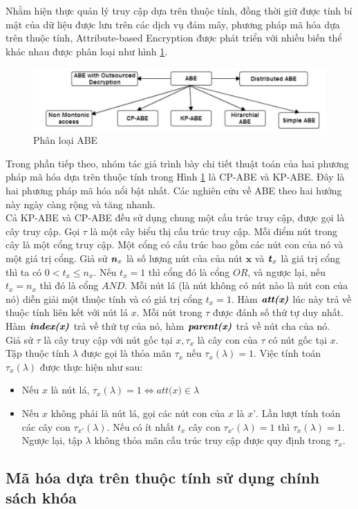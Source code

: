 \indent Nhằm hiện thực quản lý truy cập dựa trên thuộc tính, đồng thời giữ được tính bí
mật của dữ liệu được lưu trên các dịch vụ đám mây, phương pháp mã hóa dựa trên thuộc tính, Attribute-based Encryption được phát triển với nhiều biến thể khác nhau được phân
loại như hình \ref{fig:chap2-abe-classified}.
\begin{figure}
    \centering
    \includegraphics[scale=0.5]{graphics/chapter-2/chap2-abe-classified.png}
    \caption{Phân loại ABE \cite{kumar2015enhanced}}
    \label{fig:chap2-abe-classified}
\end{figure}
Trong phần tiếp theo, nhóm tác giả trình bày chi tiết thuật toán của hai phương
pháp mã hóa dựa trên thuộc tính trong Hình \ref{fig:chap2-abe-classified} là CP-ABE và KP-ABE. Đây là hai
phương pháp mã hóa nổi bật nhất. Các nghiên cứu về ABE theo hai hướng này ngày
càng rộng và tăng nhanh. \\
\indent Cả KP-ABE và CP-ABE đều sử dụng chung một cấu trúc truy cập, được gọi là
cây truy cập. Gọi $\tau $ là một cây biểu thị cấu trúc truy cập. Mỗi điểm nút trong cây là một cổng truy cập. Một cổng có cấu trúc bao gồm các nút con của nó và một giá trị cổng. Giả sử $\textbf{\textit{n}}_x$ là số lượng nút của của nút $\textbf{x}$ và $\textbf{\textit{t}}_x$ là giá trị cổng thì ta có $0 < \textit{t}_x \leq \textit{n}_x$. Nếu $\textit{t}_x = 1$ thì cổng đó là cổng $OR$, và ngược lại, nếu $\textit{t}_x = \textit{n}_x$ thì đó là cổng $AND$. Mỗi nút lá (là
nút không có nút nào là nút con của nó) diễn giải một thuộc tính và có giá trị cổng $\textit{t}_x = 1$. Hàm $\textbf{\textit{att(x)}}$ lúc này trả về thuộc tính liên kết với nút lá $\textit{x}$. Mỗi nút trong $\tau$ được đánh số thứ tự duy nhất. Hàm $\textbf{\textit{index(x)}}$ trả về thứ tự của nó, hàm $\textbf{\textit{parent(x)}}$ trả về nút cha của nó.\\
\indent Giả sử $\tau$ là cây truy cập với nút gốc tại $\textit{x}, \tau_x$ là cây con của $\tau$ có nút gốc tại $\textit{x}$. Tập thuộc tính $\lambda$ được gọi là thỏa mãn $\tau_x$ nếu $\tau_x(\lambda) = 1$. Việc tính toán $\tau_x(\lambda)$ được thực hiện như sau:
\begin{itemize}
    \item Nếu $\textit{x}$ là nút lá, $\tau_x(\lambda) = 1 \iff \textit{att(x)} \in \lambda$
    \item Nếu $\textit{x}$ không phải là nút lá, gọi các nút con của $\textit{x}$  là $\textit{x'}$. Lần lượt tính toán các cây con $\tau_{x'}(\lambda)$. Nếu có ít nhất $t_x$ cây con $\tau_{x'}(\lambda) = 1$ thì $\tau_{x}(\lambda) = 1$. Ngược lại, tập $\lambda$ không thỏa mãn cấu trúc truy cập được quy định trong $\tau_{x}$.
\end{itemize}

\subsection{Mã hóa dựa trên thuộc tính sử dụng chính sách khóa}